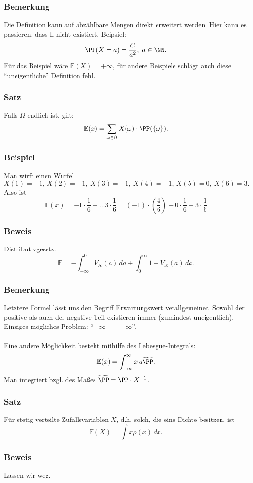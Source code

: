 \subsubsection{Bemerkung}
Die Definition kann auf abz\"ahlbare Mengen direkt erweitert werden. Hier kann es passieren, dass $\mathbb{E}$ nicht existiert. Beipsiel:
\[\PP(X=a)=\frac{C}{a^2},\ a\in\NN.\]
F\"ur das Beispiel w\"are $\mathbb{E}(X)=+\infty$, f\"ur andere Beispiele schl\"agt auch diese ``uneigentliche'' Definition fehl.
\subsubsection{Satz}
Falls $\Omega$ endlich ist, gilt:
\[\mathbb{E}(x)=\sum_{\omega\in\Omega}X(\omega)\cdot\PP(\{\omega\}).\]
\subsubsection{Beispiel}
Man wirft einen W\"urfel
\[X(1)=-1,\ X(2)=-1,\ X(3)=-1,\ X(4)=-1,\ X(5)=0,\ X(6)=3.\]
Also ist
\[\mathbb{E}(x)=-1\cdot\frac{1}{6}+\ldots3\cdot\frac{1}{6}=(-1)\cdot(\frac{4}{6})+0\cdot\frac{1}{6}+3\cdot\frac{1}{6}\]
\subsubsection{Beweis}
Distributivgesetz:
\[\mathbb{E}=-\int_{-\infty}^{0}V_X(a)\,da+\int_0^\infty1-V_X(a)\,da.\]
\subsubsection{Bemerkung}
Letztere Formel l\"asst uns den Begriff Erwartungswert verallgemeiner. Sowohl der positive als auch der negative Teil existieren immer (zumindest uneigentlich). Einziges m\"ogliches Problem: ``$+\infty\ +\ -\infty$''.
\\~\\
Eine andere M\"oglichkeit besteht mithilfe des Lebesgue-Integrals:
\[\mathbb{E}(x)=\int_{-\infty}^{\infty}x\,d\widetilde{\PP}.\]
Man integriert bzgl. des Ma\ss{}es $\widetilde{\PP}=\PP\cdot X^{-1}$.
\subsubsection{Satz}
F\"ur stetig verteilte Zufallsvariablen $X$, d.h. solch, die eine Dichte besitzen, ist
\[\mathbb{E}(X)=\int x\rho(x)\,dx.\]
\subsubsection{Beweis}
Lassen wir weg.
